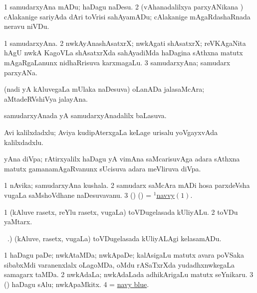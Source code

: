 \noindent
\gl{\akirx}
\bmng
\bnum
\num{1} samudarxyAna mADu; haDagu naDesu. 
\num{2} (vAhanadalilxya parxyANikana \vi) cAlakanige sariyAda dAri toVrisi sahAyamADu; cAlakanige mAgaRdashaRnada neravu niVDu. 
\enum
\emng
\eentry

\bentry
{}
\gl{\nA}
\bmng
\bnum
\num{1} samudarxyAna. 
\num{2} nwkAyAnashAsatxrX; nwkAgati shAsatxrX; reVKAgaNita hAgU nwkA KagoVLa shAsatxrXda sahAyadiMda haDagina sAthxna matutx mAgaRgaLanunx nidhaRrisuva karxmagaLu. 
\num{3} samudarxyAna; samudarx parxyANa. 
\enum
\emng

\noindent
\gl{\pagu}
\bmng
{} (nadi yA kAluvegaLa mUlaka naDesuva) oLanADa jalasaMcAra; aMtadeRVshiVya jalayAna. 
\emng
\eentry

\bentry
{}
\gl{\gu}
\bmng
samudarxyAnada yA samudarxyAnadalilx baLasuva. 
\emng
\eentry

\bentry
{}
\gl{\nA}
\bmng
Avi kalilxdadxlu; Aviya kudipAterxgaLa keLage urisalu yoVgayxvAda kalilxdadxlu. 
\emng
\eentry

\bentry
{}
\gl{\nA}
\bmng
yAna diVpa; rAtirxyalilx haDagu yA vimAna saMcarisuvAga adara sAthxna matutx gamanamAgaRvanunx sUcisuva adara meVliruva diVpa. 
\emng
\eentry

\bentry
{}
\gl{\nA}
\bmng
\bnum
\num{1} nAvika; samudarxyAna kushala. 
\num{2} samudarx saMcAra mADi hosa parxdeVsha \mo vugaLa saMshoVdhane naDesuvavanu. 
\num{3} (\birx) (\pArxparx) = \hyperlink{navvy(1)}{$^1$navvy\((1)\)}. 
\enum
\emng
\eentry

\bentry
{}
\gl{\nA}
\bmng
\bnum
\num{1} (kAluve rasetx, reYlu rasetx, \mo vugaLa) toVDugelasada kUliyALu. 
\num{2} toVDu yaMtarx. 
\enum
\emng
\eentry

\bentry
{}
\gl{\akirx}
\BUkaq\ .)\bmng
(kAluve, rasetx, \mo vugaLa) toVDugelasada kUliyALAgi kelasamADu. 
\emng
\eentry

\bentry
{}
\gl{\nA}
\bmng
\bnum
\num{1} haDagu paDe; nwkAtaMDa; nwkApaDe; kalAsigaLu matutx avara poVSaka sibabxMdi \mo varanenxlalx oLagoMDa, oMdu rASaTxrXda yudadhxnwkegaLa samagarx taMDa. 
\num{2} nwkAdaLa; nwkAdaLada adhikArigaLu matutx seYnikaru. 
\num{3} (\kAparx) haDagu sAlu; nwkApaMkitx. 
\num{4} = \hyperlink{navy blue}{navy blue}. 
\enum
\emng

